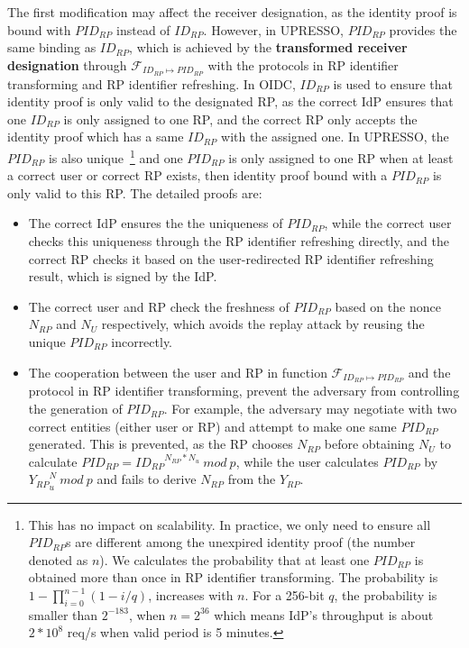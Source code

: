 The first modification may affect the receiver designation, as the identity proof is bound with $PID_{RP}$ instead of $ID_{RP}$.
However, in UPRESSO, $PID_{RP}$ provides the same binding as $ID_{RP}$, which is achieved by the \textbf{transformed receiver designation} through $\mathcal{F}_{ID_{RP} \mapsto PID_{RP}}$  with the protocols in  RP identifier transforming and RP identifier refreshing.
In OIDC, $ID_{RP}$ is used to ensure that  identity proof is only valid to the designated RP, as the correct IdP ensures that one $ID_{RP}$ is only assigned to one RP, and the correct RP only accepts the identity proof which has a same $ID_{RP}$ with the assigned one.
In UPRESSO, the $PID_{RP}$ is also unique~\footnote{This has no impact on scalability. In practice, we only need to ensure all $PID_{RP}$s are different among the unexpired identity proof (the number denoted as $n$). We calculates the probability that at least one $PID_{RP}$ is obtained more than once in RP identifier transforming. The probability is $1-\prod_{i=0}^{n-1}(1-i/q)$, increases with $n$. For  a 256-bit $q$, the probability is smaller than $2^{-183}$, when $n=2^{36}$ which means IdP's throughput is about $2*10^8$ req/s when valid period is 5 minutes.}
and one $PID_{RP}$ is  only assigned to one RP when at least a correct user or correct RP exists, then identity proof bound with a $PID_{RP}$ is only valid to this RP. The detailed proofs are:
\begin{itemize}
  \item The correct IdP ensures the the uniqueness of $PID_{RP}$, while the correct user checks this uniqueness through the RP identifier refreshing directly, and the correct RP checks it based on the user-redirected RP identifier refreshing result, which is signed by the IdP.
  \item The correct user and RP check the freshness of $PID_{RP}$ based on the nonce $N_{RP}$ and $N_U$ respectively,
   which avoids the replay attack by reusing the unique $PID_{RP}$ incorrectly.
  \item The cooperation between the user and RP in function $\mathcal{F}_{ID_{RP} \mapsto PID_{RP}}$ and the protocol in RP identifier transforming, prevent the adversary from controlling the generation of $PID_{RP}$. For example, the adversary may negotiate with two correct entities (either user or RP) and attempt to make one same $PID_{RP}$ generated.
  This is prevented, as the RP chooses $N_{RP}$ before obtaining $N_{U}$ to calculate $PID_{RP}={ID_{RP}}^{N_{RP}*N_{u}}\ mod \ p$, while the user calculates $PID_{RP}$ by ${Y_{RP}}^N_{u}\ mod \ p$ and  fails to derive $N_{RP}$ from the $Y_{RP}$.
\end{itemize}


